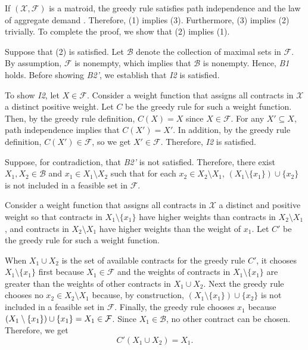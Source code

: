 \documentclass[12pt]{amsart}
\theoremstyle{remark}
\begin{document}
If $(\mathcal{X},\mathcal{F})$ is a matroid, the greedy rule satisfies
path independence \citep{fleiner2001} and the law of aggregate demand \citep{yokoi2019}. Therefore, (1) implies (3). Furthermore, (3)
implies (2) trivially. To complete the proof, we show that
(2) implies (1).

Suppose that (2) is satisfied. Let $\mathcal B$ denote the
collection of maximal sets in $\mathcal F$.
By assumption, $\mathcal{F}$ is nonempty, which implies that $\mathcal{B}$
is nonempty. Hence, \emph{B1} holds. Before
showing \emph{B2'}, we establish that \emph{I2} is satisfied.

To show \emph{I2}, let $X \in \mathcal{F}$.
Consider a weight function that assigns all contracts in $\mathcal{X}$ a
distinct positive weight. Let $C$ be the greedy rule for such a weight function.
Then, by the greedy rule definition, $C(X)=X$ since $X\in \mathcal{F}$. For any
$X'\subseteq X$, path independence implies that $C(X')=X'$.
In addition, by the greedy rule definition, $C(X')\in \mathcal{F}$,
so we get $X'\in \mathcal{F}$. Therefore, \emph{I2} is satisfied.

Suppose, for contradiction, that \emph{B2'} is not satisfied. Therefore,
there exist $X_1, X_2 \in \mathcal B$ and $x_1 \in X_1 \setminus X_2$
such that for each $x_2 \in X_2 \setminus X_1$, $(X_1 \setminus \{x_1\}) \cup \{x_2\}$ is not included in a feasible set in $\mathcal{F}$.

Consider a weight function that assigns all contracts in $\mathcal{X}$ a
distinct and positive weight so that contracts in $X_1 \setminus \{x_1\}$
have higher weights than contracts in $X_2 \setminus X_1$, and contracts
in $X_2 \setminus X_1$ have higher weights than the weight of $x_1$.
Let $C'$ be the greedy rule for such a weight function.

When $X_1 \cup X_2$ is the set of available contracts for the greedy rule $C'$,
it chooses $X_1 \setminus \{x_1\}$ first because $X_1 \in \mathcal{F}$ and the weights of contracts in $X_1 \setminus \{x_1\}$ are greater
than the weights of other contracts in $X_1 \cup X_2$. Next the greedy rule chooses no $x_2\in X_2 \setminus X_1$ because, by construction, $(X_1 \setminus \{x_1\}) \cup \{x_2\}$ is not included in a feasible set in $\mathcal{F}$. Finally, the greedy rule chooses $x_1$ because $(X_1 \setminus \{x_1\}) \cup \{x_1\}=X_1 \in \mathcal{F}$. Since $X_1\in \mathcal{B}$, no other contract
can be chosen. Therefore, we get
\[C'(X_1 \cup X_2) = X_1.\]
\end{document}
